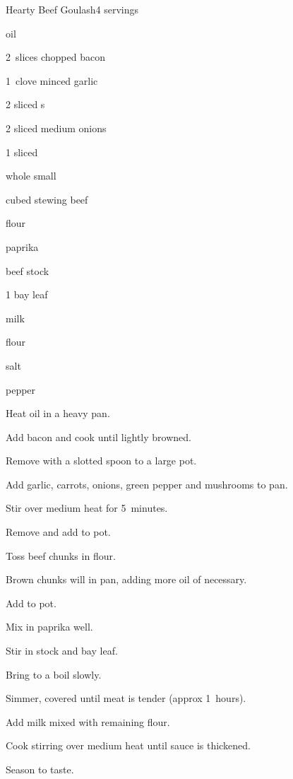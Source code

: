 \begin{recipe}{Hearty Beef Goulash}{}{4 servings}

\begin{ingredients}
\item {} oil
\item 2~slices chopped bacon
\item 1~clove minced garlic
\item 2 sliced s
\item 2 sliced medium onions
\item 1 sliced 
\item \lbs{\quarter} whole small 
\item \lbs{1\half} cubed stewing beef
\item \C{\quarter} flour
\item {}paprika
\item {} beef stock
\item 1 bay leaf
\item {} milk
\item {} flour
\item salt
\item pepper
\end{ingredients}

\begin{directions}
\item Heat oil in a heavy pan.
\item Add bacon and cook until lightly browned.
\item Remove with a slotted spoon to a large pot.
\item Add garlic, carrots, onions, green pepper and mushrooms to pan.
\item Stir over medium heat for 5~minutes.
\item Remove and add to pot.
\item Toss beef chunks in flour.
\item Brown chunks will in pan, adding more oil of necessary.
\item Add to pot.
\item Mix in paprika well.
\item Stir in stock and bay leaf.
\item Bring to a boil slowly.
\item Simmer, covered until meat is tender (approx 1\half~hours).
\item Add milk mixed with remaining flour.
\item Cook stirring over medium heat until sauce is thickened.
\item Season to taste.
\end{directions}

\end{recipe}

